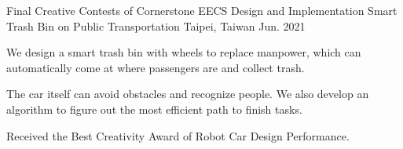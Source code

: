 \begin{cventries}
  \cventry
    {Final Creative Contests of Cornerstone EECS Design and Implementation} %
    {Smart Trash Bin on Public Transportation} %
    {Taipei, Taiwan} %
    {Jun. 2021} %
    {
      \begin{cvitems} %
        \item {We design a smart trash bin with wheels to replace manpower, which can automatically come at where passengers are and collect trash.}
        \item {The car itself can avoid obstacles and recognize people. We also develop an algorithm to figure out the most efficient path to finish tasks.}
        \item {Received the Best Creativity Award of Robot Car Design Performance.}
      \end{cvitems}
    }

\end{cventries}
